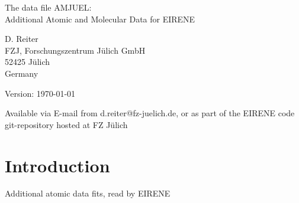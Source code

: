 \documentclass[12pt,dvipdfmx]{article}
\begin{document}
\parindent 0pt
{\LARGE \bf \center
\vspace*{3truecm}

The data file AMJUEL: \\
Additional Atomic and Molecular Data for EIRENE
\vspace*{3truecm}

D. Reiter \\
FZJ, Forschungszentrum J\"ulich GmbH \\
52425 J\"ulich \\
Germany
\vspace{3truecm}

Version: \today
\vspace{1truecm}

Available via E-mail from d.reiter@fz-juelich.de, or as part of the
EIRENE code git-repository hosted at FZ J\"ulich
}
\newpage
\renewcommand\thesection{\Roman{section}}
\newpage
{}
\tableofcontents
\newpage
\section{Introduction}\label{sec-intro}

Additional atomic data fits, read by EIRENE
\end{document}
